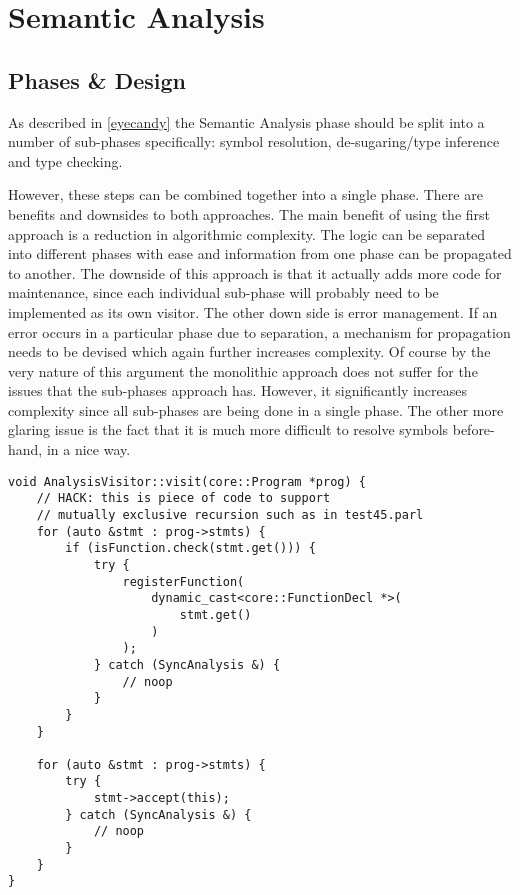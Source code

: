 \section{Semantic Analysis}

\subsection{Phases \& Design}

As described in \ref{eyecandy} the Semantic Analysis phase
should be split into a number of sub-phases specifically: symbol
resolution, de-sugaring/type inference and type checking.

However, these steps can be combined together into a single
phase. There are benefits and downsides to both approaches. The
main benefit of using the first approach is a reduction in
algorithmic complexity. The logic can be separated into
different phases with ease and information from one phase can be
propagated to another. The downside of this approach is that it
actually adds more code for maintenance, since each individual
sub-phase will probably need to be implemented as its own
visitor. The other down side is error management. If an error
occurs in a particular phase due to separation, a mechanism for
propagation needs to be devised which again further increases
complexity. Of course by the very nature of this argument the
monolithic approach does not suffer for the issues that the
sub-phases approach has. However, it significantly increases
complexity since all sub-phases are being done in a single
phase. The other more glaring issue is the fact that it is much
more difficult to resolve symbols before-hand, in a nice way.

\begin{lstlisting}[caption={The \texttt{visit(Program *)} method
in the \texttt{AnalysisVisitor} class, showing the hack used for
resolving function symbols before-hand
(analysis/AnalysisVisitor.cpp).},label=lst:funcdeclhack]
void AnalysisVisitor::visit(core::Program *prog) {
    // HACK: this is piece of code to support
    // mutually exclusive recursion such as in test45.parl
    for (auto &stmt : prog->stmts) {
        if (isFunction.check(stmt.get())) {
            try {
                registerFunction(
                    dynamic_cast<core::FunctionDecl *>(
                        stmt.get()
                    )
                );
            } catch (SyncAnalysis &) {
                // noop
            }
        }
    }

    for (auto &stmt : prog->stmts) {
        try {
            stmt->accept(this);
        } catch (SyncAnalysis &) {
            // noop
        }
    }
}
\end{lstlisting}

